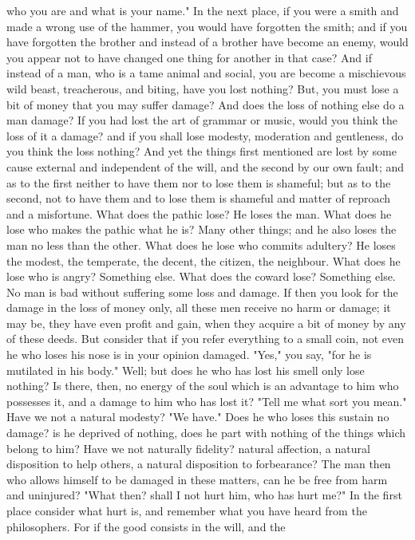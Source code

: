 \documentclass[a4paper]{article}
\begin{document}
who you are and what is your name." In the next place, if you were a smith and
made a wrong use of the hammer, you would have forgotten the smith; and if you
have forgotten the brother and instead of a brother have become an enemy, would
you appear not to have changed one thing for another in that case? And if
instead of a man, who is a tame animal and social, you are become a mischievous
wild beast, treacherous, and biting, have you lost nothing? But, you must lose
a bit of money that you may suffer damage? And does the loss of nothing else do
a man damage? If you had lost the art of grammar or music, would you think the
loss of it a damage? and if you shall lose modesty, moderation and gentleness,
do you think the loss nothing? And yet the things first mentioned are lost by
some cause external and independent of the will, and the second by our own
fault; and as to the first neither to have them nor to lose them is shameful;
but as to the second, not to have them and to lose them is shameful and matter
of reproach and a misfortune. What does the pathic lose? He loses the man. What
does he lose who makes the pathic what he is? Many other things; and he also
loses the man no less than the other. What does he lose who commits adultery?
He loses the modest, the temperate, the decent, the citizen, the neighbour.
What does he lose who is angry? Something else. What does the coward lose?
Something else. No man is bad without suffering some loss and damage. If then
you look for the damage in the loss of money only, all these men receive no
harm or damage; it may be, they have even profit and gain, when they acquire a
bit of money by any of these deeds. But consider that if you refer everything
to a small coin, not even he who loses his nose is in your opinion damaged.
"Yes," you say, "for he is mutilated in his body." Well; but does he who has
lost his smell only lose nothing? Is there, then, no energy of the soul which
is an advantage to him who possesses it, and a damage to him who has lost it?
"Tell me what sort you mean." Have we not a natural modesty? "We have." Does he
who loses this sustain no damage? is he deprived of nothing, does he part with
nothing of the things which belong to him? Have we not naturally fidelity?
natural affection, a natural disposition to help others, a natural disposition
to forbearance? The man then who allows himself to be damaged in these matters,
can he be free from harm and uninjured? "What then? shall I not hurt him, who
has hurt me?" In the first place consider what hurt is, and remember what you
have heard from the philosophers. For if the good consists in the will, and the
\end{document}
